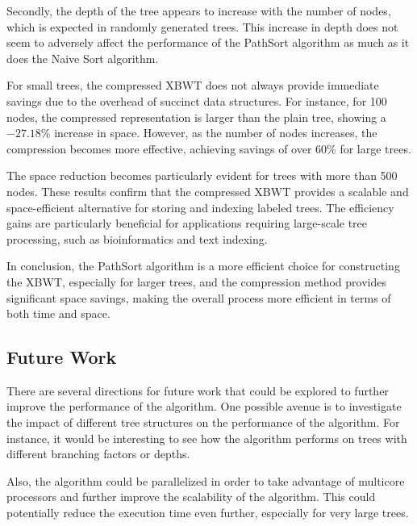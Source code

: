 Secondly, the depth of the tree appears to increase with the number of nodes, which is expected in randomly generated trees. This increase in depth does not seem to adversely affect the performance of the PathSort algorithm as much as it does the Naive Sort algorithm.

For small trees, the compressed XBWT does not always provide immediate savings due to the overhead of succinct data structures. For instance, for 100 nodes, the compressed representation is larger than the plain tree, showing a \(-27.18\%\) increase in space. However, as the number of nodes increases, the compression becomes more effective, achieving savings of over 60\% for large trees.

The space reduction becomes particularly evident for trees with more than 500 nodes. These results confirm that the compressed XBWT provides a scalable and space-efficient alternative for storing and indexing labeled trees. The efficiency gains are particularly beneficial for applications requiring large-scale tree processing, such as bioinformatics and text indexing.

In conclusion, the PathSort algorithm is a more efficient choice for constructing the XBWT, especially for larger trees, and the compression method provides significant space savings, making the overall process more efficient in terms of both time and space.

\subsection{Future Work}
There are several directions for future work that could be explored to further improve the performance of the algorithm. One possible avenue is to investigate the impact of different tree structures on the performance of the algorithm. For instance, it would be interesting to see how the algorithm performs on trees with different branching factors or depths.

Also, the algorithm could be parallelized in order to take advantage of multicore processors and further improve the scalability of the algorithm. This could potentially reduce the execution time even further, especially for very large trees.
